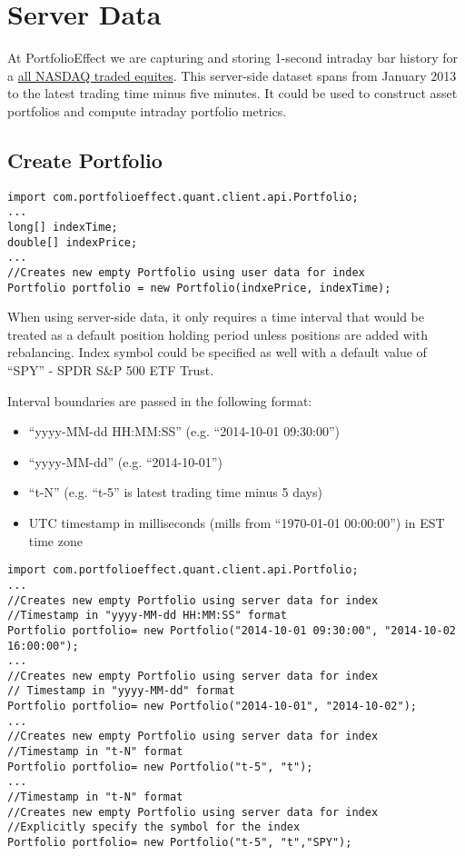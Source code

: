 \documentclass[letterpaper]{report}
\newcounter{N}
\begin{document}
\section{Server Data}
At PortfolioEffect we are capturing and storing 1-second intraday bar history for a 
\href{https://www.portfolioeffect.com/docs/symbology}{all NASDAQ traded equites}.
This server-side dataset spans from January 2013 to the latest trading time minus five minutes. 
It could be used to construct asset portfolios and compute intraday portfolio metrics.

\subsection{Create Portfolio}

\begin{lstlisting}
import com.portfolioeffect.quant.client.api.Portfolio;
...
long[] indexTime;
double[] indexPrice;
...
//Creates new empty Portfolio using user data for index
Portfolio portfolio = new Portfolio(indxePrice, indexTime);
\end{lstlisting}
When using server-side data, it only requires a time interval that would be
treated as a default position holding period unless positions are added with rebalancing.
Index symbol could be specified as well with a default value of ``SPY'' - SPDR
S\&P 500 ETF Trust.
\par
Interval boundaries are passed in the following format:
  \begin{itemize} 
\item ``yyyy-MM-dd HH:MM:SS'' (e.g. ``2014-10-01 09:30:00'')
\item ``yyyy-MM-dd'' (e.g. ``2014-10-01'')
\item ``t-N'' (e.g. ``t-5'' is latest trading time minus 5 days)
\item UTC timestamp in milliseconds (mills from ``1970-01-01 00:00:00'') in EST
time zone
\end{itemize}
\begin{lstlisting}
import com.portfolioeffect.quant.client.api.Portfolio;
...
//Creates new empty Portfolio using server data for index
//Timestamp in "yyyy-MM-dd HH:MM:SS" format
Portfolio portfolio= new Portfolio("2014-10-01 09:30:00", "2014-10-02 16:00:00");
...
//Creates new empty Portfolio using server data for index
// Timestamp in "yyyy-MM-dd" format
Portfolio portfolio= new Portfolio("2014-10-01", "2014-10-02");
...
//Creates new empty Portfolio using server data for index
//Timestamp in "t-N" format
Portfolio portfolio= new Portfolio("t-5", "t");
...
//Timestamp in "t-N" format
//Creates new empty Portfolio using server data for index
//Explicitly specify the symbol for the index 
Portfolio portfolio= new Portfolio("t-5", "t","SPY");
\end{lstlisting}
\end{document}
